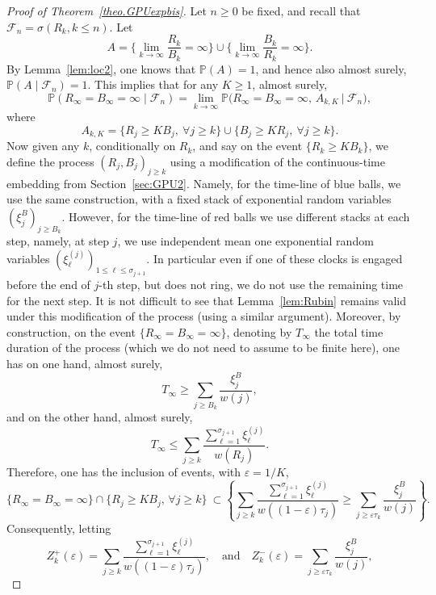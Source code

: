 \documentclass[10pt,a4paper]{amsart}
\newcommand{\1}{{\text{\Large $\mathfrak 1$}}}
\begin{document}
\begin{proof}[Proof of Theorem~\ref{theo.GPUexpbis}]
Let $n\ge 0$ be fixed, and recall that $\mathcal F_n = \sigma(R_k,k\le n)$. 
Let 
$$A= \Big\{ \lim_{k\to \infty} \frac{R_k}{B_k} = \infty\Big\} \cup \Big\{\lim_{k\to \infty} \frac{B_k}{R_k} = \infty\Big\}.$$ 
By Lemma~\ref{lem:loc2}, one knows that $\mathbb P(A) = 1$, and hence also almost surely, $\mathbb P(A \mid \mathcal F_n) = 1$.  
This implies that  for any $K\ge 1$, almost surely,
\begin{equation}\label{limiteRinftyBinfty}
\mathbb P(R_\infty = B_\infty = \infty \mid \mathcal F_n) = \lim_{k\to \infty} \mathbb P\big(R_\infty = B_\infty = \infty, \, A_{k,K}\ \big|\ \mathcal F_n\big), 
\end{equation}
where 
$$A_{k,K} = \big\{ R_j \ge K B_j, \ \forall j\ge k \big\}\cup \big\{ B_j \ge K R_j, \ \forall j\ge k \big\}. $$ 
Now given any $k$, conditionally on $R_k$, and say on the event $\{R_k \ge KB_k\}$, we define the process $(R_j,B_j)_{j\ge k}$ using a modification of the continuous-time embedding from Section~\ref{sec:GPU2}. Namely, for the time-line of blue balls, we use the same construction, with a fixed stack of exponential random variables $(\xi_j^B)_{j\ge B_k}$. However, for the time-line of red balls we use different stacks at each step, namely, at step $j$, we use independent mean one exponential random variables $(\xi_{\ell}^{(j)})_{1\le \ell \le \sigma_{j+1}}$. In particular even if one of these clocks is engaged before the end of $j$-th step, but does not ring, we do not use the remaining time for the next step. It is not difficult to see that Lemma~\ref{lem:Rubin} remains valid under this modification of the process (using a similar argument). 
Moreover, by construction, on the event $\{R_\infty = B_\infty = \infty\}$, denoting by $T_\infty$ the total time duration of the process (which we do not need to assume  to be finite here), one has on one hand, almost surely,  
$$T_\infty \ge \sum_{j\ge B_k} \frac{\xi_j^B}{w(j)},$$
and on the other hand, almost surely, 
$$T_\infty \le \sum_{j\ge k} \frac{\sum_{\ell=1}^{\sigma_{j+1}} \xi_\ell^{(j)}}{w(R_j)}. $$ 
Therefore, one has the inclusion of events, with $\varepsilon = 1/K$, 
$$\{R_\infty = B_\infty = \infty\}\cap \{R_j\ge K B_j, \, \forall j\ge k\} \ \subset \left\{\sum_{j\ge k} \frac{\sum_{\ell=1}^{\sigma_{j+1}} \xi_\ell^{(j)}}{w((1-\varepsilon)\tau_j)} \ge 
\sum_{j\ge \varepsilon \tau_k} \frac{\xi_j^B}{w(j)}\right\}.$$
Consequently, letting 
$$Z_k^+(\varepsilon) = \sum_{j\ge k} \frac{\sum_{\ell=1}^{\sigma_{j+1}} \xi_\ell^{(j)}}{w((1-\varepsilon)\tau_j)}, \quad\text{and}\quad Z_k^-(\varepsilon) = \sum_{j\ge \varepsilon \tau_k} \frac{\xi_j^B}{w(j)},$$

\end{proof}
\end{document}
